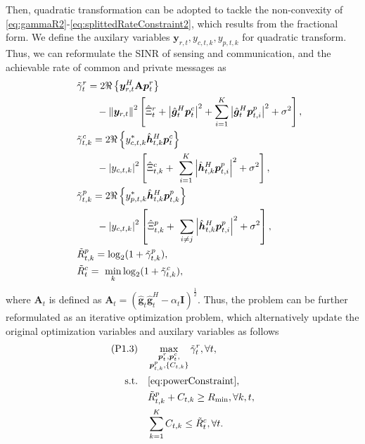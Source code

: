 \documentclass[twocolumn,journal]{IEEEtran}
\begin{document}
Then, quadratic transformation \cite{shenFractional2018a} can be adopted to tackle the non-convexity of \eqref{eq:gammaR2}-\eqref{eq:splittedRateConstraint2}, which results from the fractional form. We define the auxilary variables \(\boldsymbol{y}_{r,t},y_{c,t,k},y_{p,t,k}\) for quadratic transform. Thus, we can reformulate the SINR of sensing and communication, and the achievable rate of common and private messages as
\begin{subequations}
\begin{align}
    &\tilde{\gamma}_{t}^{r}=2\Re\left\{\boldsymbol{y}_{r,t}^H\mathbf{A}\boldsymbol{p}^{r}_{t}\right\}\notag\\
    &\qquad-\left\Vert \boldsymbol{y}_{r,t}\right\Vert^2 \left[\hat{\Xi}^{r}_{t} + \left| \hat{\boldsymbol{g}}^{H}_{t}\boldsymbol{p}^{c}_{t}\right|^2 + \sum_{i=1}^{K}\left| \hat{\boldsymbol{g}}^{H}_{t}\boldsymbol{p}^{p}_{t,i}\right|^2 + \sigma^2\right],\\
    &\tilde{\gamma}_{t,k}^{c}=2\Re\left\{ y_{c,t,k}^{*}\hat{\boldsymbol{h}}^{H}_{t,k}\boldsymbol{p}^{c}_{t} \right\}\notag\\ 
    &\qquad- \left\vert y_{c,t,k} \right\vert^2\left[ \hat{\Xi}^{c}_{t,k} +  \sum_{i=1}^{K}\left| \hat{\boldsymbol{h}}^{H}_{t,k}\boldsymbol{p}^{p}_{t,i}\right|^2 + \sigma^2 \right],\\
    &\tilde{\gamma}_{t,k}^{p}=2\Re\left\{ y_{p,t,k}^{*}\hat{\boldsymbol{h}}^{H}_{t,k}\boldsymbol{p}^{p}_{t,k} \right\}\notag\\ 
    &\qquad- \left\vert y_{c,t,k} \right\vert^2\left[ \hat{\Xi}^{p}_{t,k} +  \sum_{i\neq j}\left| \hat{\boldsymbol{h}}^{H}_{t,k}\boldsymbol{p}^{p}_{t,i}\right|^2 + \sigma^2 \right],\\
    &\tilde{R}^{p}_{t,k} = \log_2(1+\tilde{\gamma}_{t,k}^{p}),\\
    &\tilde{R}^{c}_{t} =  \min_{k}\log_2(1+\tilde{\gamma}_{t,k}^{c}),
\end{align}
\end{subequations}
where \(\mathbf{A}_t\) is defined as \(\mathbf{A}_t = \left(\hat{\boldsymbol{g}}_{t}\hat{\boldsymbol{g}}^{H}_{t}-\alpha_t\mathbf{I}\right)^{\frac{1}{2}}\). Thus, the problem can be further reformulated as an iterative optimization problem, which alternatively update the original optimization variables and auxilary variables as follows
\begin{subequations}
\begin{align}
 (\text{P1.3})\quad&\mathop{\max}_{{\substack{\boldsymbol{p}^{r}_{t},\boldsymbol{p}^{c}_{t},\\
 \boldsymbol{p}^{p}_{t,k},\left\{C_{t,k}\right\}}}}\tilde{\gamma}_{t}^{r}, \forall t,\label{eq:gammaRQT}\\
 \text{s.t.}\quad&\eqref{eq:powerConstraint},\notag\\
 \quad&\tilde{R}^{p}_{t,k} + C_{t,k} \geq R_{\min}, \forall k,t,\label{eq:rateConstraintQT}\\
    & \sum_{k=1}^{K} C_{t,k} \leq \tilde{R}^{c}_{t}, \forall t. \label{eq:splittedRateConstraintQT}
\end{align}
\end{subequations}
\end{document}
